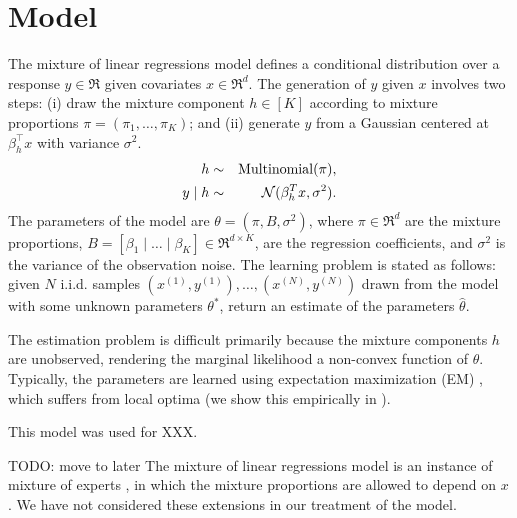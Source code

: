 \section{Model}
\label{sec:model}

\newcommand{\xn}[1]{x^{(#1)}}
\newcommand{\xni}{\xn{i}}
\newcommand{\yn}[1]{y^{(#1)}}
\newcommand{\yni}{\yn{i}}

The mixture of linear regressions model \citep{VieleTong2002} defines
a conditional distribution over a response $y \in \Re$
given covariates $x \in \Re^d$.
The generation of $y$ given $x$ involves two steps:
(i) draw the mixture component $h \in [K]$ according to mixture proportions
$\pi = (\pi_1, \dots, \pi_K)$;
and (ii) generate $y$ from a Gaussian centered at $\beta_h^\top x$ with
variance $\sigma^2$.
\begin{eqnarray*}
  h &\sim& \operatorname{Multinomial}(\pi), \\
  y \mid h &\sim& \mathcal{N}( \beta_{h}^T x,  \sigma^2 ).
\end{eqnarray*}
The parameters of the model are $\theta = (\pi, B, \sigma^2)$,
where $\pi \in \Re^d$ are the mixture proportions,
$B = [\beta_1 \mid \dots \mid \beta_K] \in \Re^{d \times K}$,
are the regression coefficients,
and $\sigma^2$ is the variance of the observation noise.
The learning problem is stated as follows:
given $N$ i.i.d. samples $(\xn{1}, \yn{1}), \dots, (\xn{N}, \yn{N})$
drawn from the model with some unknown parameters $\theta^*$,
return an estimate of the parameters $\hat\theta$.



The estimation problem is difficult primarily because the mixture
components $h$ are unobserved, rendering the marginal likelihood
a non-convex function of $\theta$.
Typically, the parameters are learned using
expectation maximization (EM) \cite{VieleTong2002},
which suffers from local optima
(we show this empirically in ).

This model was used for XXX.

TODO: move to later
The mixture of linear regressions model is an instance of
mixture of experts \cite{jacobs91},
in which the mixture proportions are allowed to depend on $x$.
We have not considered these extensions in our treatment of the model.
